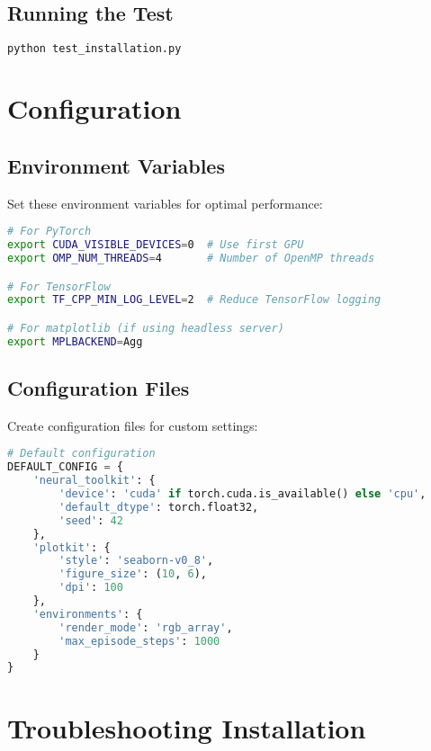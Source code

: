 \subsection{Running the Test}

\begin{lstlisting}[language=bash, caption=Running installation test]
python test_installation.py
\end{lstlisting}

\section{Configuration}

\subsection{Environment Variables}

Set these environment variables for optimal performance:

\begin{lstlisting}[language=bash, caption=Setting environment variables]
# For PyTorch
export CUDA_VISIBLE_DEVICES=0  # Use first GPU
export OMP_NUM_THREADS=4       # Number of OpenMP threads

# For TensorFlow
export TF_CPP_MIN_LOG_LEVEL=2  # Reduce TensorFlow logging

# For matplotlib (if using headless server)
export MPLBACKEND=Agg
\end{lstlisting}

\subsection{Configuration Files}

Create configuration files for custom settings:

\begin{lstlisting}[language=python, caption=config.py example]
# Default configuration
DEFAULT_CONFIG = {
    'neural_toolkit': {
        'device': 'cuda' if torch.cuda.is_available() else 'cpu',
        'default_dtype': torch.float32,
        'seed': 42
    },
    'plotkit': {
        'style': 'seaborn-v0_8',
        'figure_size': (10, 6),
        'dpi': 100
    },
    'environments': {
        'render_mode': 'rgb_array',
        'max_episode_steps': 1000
    }
}
\end{lstlisting}

\section{Troubleshooting Installation}

